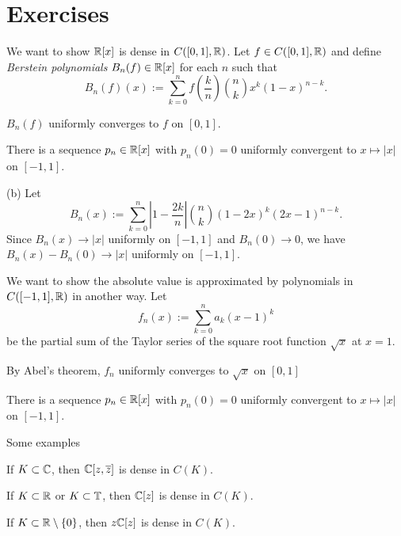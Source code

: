 \documentclass{../../large}
\begin{document}
\section*{Exercises}
\begin{prb}
\end{prb}
\begin{prb}
We want to show $\mathbb{R}[x]$ is dense in $C([0,1],\mathbb{R})$.
Let $f\in C([0,1],\mathbb{R})$ and define \emph{Berstein polynomials} $B_n(f)\in\mathbb{R}[x]$ for each $n$ such that
\[B_n(f)(x):=\sum_{k=0}^nf\left(\frac kn\right)\binom nkx^k(1-x)^{n-k}.\]
\begin{parts}
\item $B_n(f)$ uniformly converges to $f$ on $[0,1]$.
\item There is a sequence $p_n\in\mathbb{R}[x]$ with $p_n(0)=0$ uniformly convergent to $x\mapsto|x|$ on $[-1,1]$.
\end{parts}
\end{prb}
\begin{pf}
(b)
Let
\[B_n(x):=\sum_{k=0}^n\left|1-\frac{2k}n\right|\binom nk(1-2x)^k(2x-1)^{n-k}.\]
Since $B_n(x)\to|x|$ uniformly on $[-1,1]$ and $B_n(0)\to0$, we have $B_n(x)-B_n(0)\to|x|$ uniformly on $[-1,1]$.
\end{pf}

\begin{prb}
We want to show the absolute value is approximated by polynomials in $C([-1,1],\mathbb{R})$ in another way.
Let
\[f_n(x):=\sum_{k=0}^n a_k(x-1)^k\]
be the partial sum of the Taylor series of the square root function $\sqrt x$ at $x=1$.
\begin{parts}
\item By Abel's theorem, $f_n$ uniformly converges to $\sqrt x$ on $[0,1]$
\item There is a sequence $p_n\in\mathbb{R}[x]$ with $p_n(0)=0$ uniformly convergent to $x\mapsto|x|$ on $[-1,1]$.
\end{parts}
\end{prb}

\begin{prb}
\end{prb}



\begin{prb}
Some examples
\begin{parts}
\item If $K\subset\mathbb{C}$, then $\mathbb{C}[z,\overline z]$ is dense in $C(K)$.
\item If $K\subset\mathbb{R}$ or $K\subset\mathbb{T}$, then $\mathbb{C}[z]$ is dense in $C(K)$.
\item If $K\subset\mathbb{R}\setminus\{0\}$, then $z\mathbb{C}[z]$ is dense in $C(K)$.
\end{parts}
\end{prb}
\end{document}
